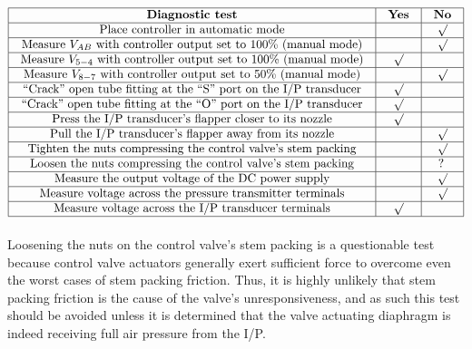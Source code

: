 $$\vbox{\offinterlineskip
\halign{\strut
\vrule \quad\hfil # \ \hfil & 
\vrule \quad\hfil # \ \hfil & 
\vrule \quad\hfil # \ \hfil \vrule \cr
\noalign{\hrule}
%
{\bf Diagnostic test} & {\bf Yes} & {\bf No} \cr
%
\noalign{\hrule}
%
Place controller in automatic mode &  & $\surd$ \cr
%
\noalign{\hrule}
%
Measure $V_{AB}$ with controller output set to 100\% (manual mode) &  & $\surd$ \cr
%
\noalign{\hrule}
%
Measure $V_{5-4}$ with controller output set to 100\% (manual mode) & $\surd$ &  \cr
%
\noalign{\hrule}
%
Measure $V_{8-7}$ with controller output set to 50\% (manual mode) &  & $\surd$ \cr
%
\noalign{\hrule}
%
``Crack'' open tube fitting at the ``S'' port on the I/P transducer & $\surd$ &  \cr
%
\noalign{\hrule}
%
``Crack'' open tube fitting at the ``O'' port on the I/P transducer & $\surd$ &  \cr
%
\noalign{\hrule}
%
Press the I/P transducer's flapper closer to its nozzle & $\surd$ &  \cr
%
\noalign{\hrule}
%
Pull the I/P transducer's flapper away from its nozzle &  & $\surd$ \cr
%
\noalign{\hrule}
%
Tighten the nuts compressing the control valve's stem packing &  & $\surd$ \cr
%
\noalign{\hrule}
%
Loosen the nuts compressing the control valve's stem packing &  & ? \cr
%
\noalign{\hrule}
%
Measure the output voltage of the DC power supply &  & $\surd$ \cr
%
\noalign{\hrule}
%
Measure voltage across the pressure transmitter terminals &  & $\surd$ \cr
%
\noalign{\hrule}
%
Measure voltage across the I/P transducer terminals & $\surd$ &  \cr
%
\noalign{\hrule}
} %
}$$ %

Loosening the nuts on the control valve's stem packing is a questionable test because control valve actuators generally exert sufficient force to overcome even the worst cases of stem packing friction.  Thus, it is highly unlikely that stem packing friction is the cause of the valve's unresponsiveness, and as such this test should be avoided unless it is determined that the valve actuating diaphragm is indeed receiving full air pressure from the I/P.
 










